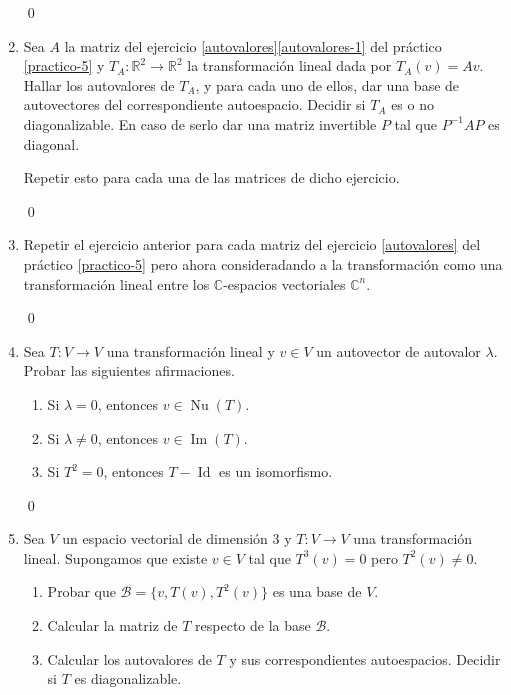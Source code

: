 \begin{enumerate}[topsep=6pt, itemsep=.4cm]
\rta


\qed



\item Sea $A$ la matriz  del ejercicio \ref{autovalores}\ref{autovalores-1} del práctico \ref{practico-5} y $T_A:\mathbb{R}^2\longrightarrow\mathbb{R}^2$ la transformación lineal dada por $T_A(v)=Av$. Hallar los autovalores de $T_A$, y para cada uno de ellos, dar una base de autovectores del correspondiente autoespacio. Decidir si $T_A$ es o no diagonalizable. En caso de serlo dar una matriz invertible $P$ tal que $P^{-1}AP$ es diagonal. 

Repetir esto para cada una de las matrices de dicho ejercicio.

\rta


\qed



\item Repetir el ejercicio anterior para cada matriz del ejercicio \ref{autovalores} del práctico \ref{practico-5} pero ahora consideradando a la transformación como una transformación lineal entre los $\mathbb{C}$-espacios vectoriales $\mathbb{C}^n$.

\rta


\qed



\item Sea $T:V\longrightarrow V$ una transformación lineal y $v\in V$ un autovector de autovalor $\lambda$. Probar las siguientes afirmaciones.
\begin{enumerate}
    \item\label{autovalor-autovector-a} Si $\lambda=0$, entonces $v\in\operatorname{Nu}(T)$.
    \item\label{autovalor-autovector-b} Si $\lambda\neq0$, entonces $v\in\operatorname{Im}(T)$.
    \item\label{autovalor-autovector-c} Si $T^2=0$, entonces $T-\operatorname{Id}$ es un isomorfismo.
\end{enumerate}

\rta


\qed



\item\label{base nilp}  Sea $V$ un espacio vectorial de dimensión $3$ y $T:V\longrightarrow V$ una transformación lineal. Supongamos que existe $v\in V$ tal que $T^3(v)=0$ pero $T^2(v)\neq0$.
\begin{enumerate}
    \item\label{base nilp a}  Probar que $\mathcal{B}=\{v,T(v),T^2(v)\}$ es una base de $V$.
    \item\label{base nilp b} Calcular la matriz de $T$ respecto de la base $\mathcal{B}$.
    \item\label{base nilp c} Calcular los autovalores de $T$ y sus correspondientes autoespacios. Decidir si $T$ es diagonalizable.
\end{enumerate}


\end{enumerate}
